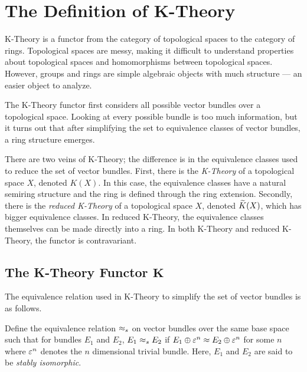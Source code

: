 \documentclass[../sean_thesis.tex]{subfiles}
\begin{document}
\chapter{The Definition of K-Theory}

K-Theory is a functor from the category of topological spaces to the category of rings. Topological spaces are messy, making it difficult to understand properties about topological spaces and homomorphisms between topological spaces. However, groups and rings are simple algebraic objects with much structure --- an easier object to analyze. 

The K-Theory functor first considers all possible vector bundles over a topological space. Looking at every possible bundle is too much information, but it turns out that after simplifying the set to equivalence classes of vector bundles, a ring structure emerges.

There are two veins of K-Theory; the difference is in the equivalence classes used to reduce the set of vector bundles. First, there is the \emph{K-Theory} of a topological space $X$, denoted $K(X)$. In this case, the equivalence classes have a natural semiring structure and the ring is defined through the ring extension. Secondly, there is the \emph{reduced K-Theory} of a topological space $X$, denoted $\widetilde{K}(X)$, which has bigger equivalence classes. In reduced K-Theory, the equivalence classes themselves can be made directly into a ring. In both K-Theory and reduced K-Theory, the functor is contravariant.
    
\section{The K-Theory Functor $\mathbf{K}$}


The equivalence relation used in K-Theory to simplify the set of vector bundles is as follows.

\begin{definition}
	Define the equivalence relation $\approx_s$ on vector bundles over the same base space such that for bundles $E_1$ and $E_2$, $E_1 \approx_s E_2$ if $E_1 \oplus \varepsilon^{n} \approx E_2 \oplus \varepsilon^{n}$ for some $n$ where $\varepsilon^{n}$ denotes the $n$ dimensional trivial bundle. Here, $E_1$ and $E_2$ are said to be \emph{stably isomorphic}.
\end{definition}
\end{document}
